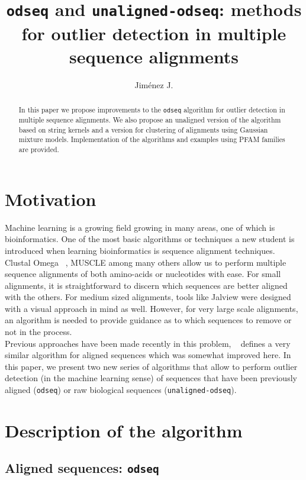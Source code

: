 \documentclass[a4paper]{llncs}
\title{\texttt{odseq} and \texttt{unaligned-odseq}: methods for outlier detection in multiple sequence alignments}
\author{Jiménez J.}
\institute{A rellenar con la institución.}
\begin{document}
\maketitle
\begin{abstract}
In this paper we propose improvements to the \texttt{odseq} algorithm for outlier detection in multiple sequence alignments. We also propose an unaligned version of the algorithm based on string kernels and a version for clustering of alignments using Gaussian mixture models. Implementation of the algorithms and examples using PFAM families are provided.
\end{abstract} 
\section{Motivation}

Machine learning is a growing field growing in many areas, one of which is bioinformatics. One of the most basic algorithms or techniques a new student is introduced when learning bioinformatics is sequence alignment techniques. Clustal Omega ~\cite{Sievers2014}, MUSCLE among many others allow us to perform multiple sequence alignments of both amino-acids or nucleotides with ease. For small alignments, it is straightforward to discern which sequences are better aligned with the others. For medium sized alignments, tools like Jalview were designed with a visual approach in mind as well. However, for very large scale alignments, an algorithm is needed to provide guidance as to which sequences to remove or not in the process.\\

Previous approaches have been made recently in this problem, ~\cite{Jehl2015} defines a very similar algorithm for aligned sequences which was somewhat improved here. In this paper, we present two new series of algorithms that allow to perform outlier detection (in the machine learning sense) of sequences that have been previously aligned (\texttt{odseq}) or raw biological sequences (\texttt{unaligned-odseq}). 


\section{Description of the algorithm}

\subsection{Aligned sequences: \texttt{odseq}}
\end{document}
